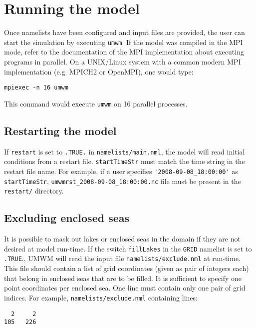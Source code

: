 \documentclass[letterpaper]{article}
\numberwithin{equation}{section}
\begin{document}
\newpage
\section{Running the model}

Once namelists have been configured and input files are provided,
the user can start the simulation by executing \verb+umwm+.
If the model was compiled in the MPI mode, refer to the documentation
of the MPI implementation about executing programs in parallel.
On a UNIX/Linux system with a common modern MPI implementation (e.g. MPICH2 or OpenMPI),
one would type:

\begin{verbatim}
mpiexec -n 16 umwm
\end{verbatim}

This command would execute \verb+umwm+ on 16 parallel processes.

\subsection{Restarting the model}
\label{sec:restart}

If \verb+restart+ is set to \verb+.TRUE.+ in \verb+namelists/main.nml+,
the model will read initial conditions from a restart file.
\verb+startTimeStr+ must match the time string in the restart file name.
For example, if a user specifies \verb+'2008-09-08_18:00:00'+ as \verb+startTimeStr+,
\verb+umwmrst_2008-09-08_18:00:00.nc+ file must be present in the \verb+restart/+ directory.

\subsection{Excluding enclosed seas}
\label{sec:lakefill}

It is possible to mask out lakes or enclosed seas in the domain 
if they are not desired at model run-time. 
If the switch \verb+fillLakes+ in the \verb+GRID+ namelist is set to \verb+.TRUE+.,
UMWM will read the input file \verb+namelists/exclude.nml+ at run-time.
This file should contain a list of grid coordinates (given as pair of integers each)
that belong in enclosed seas that are to be filled.
It is sufficient to specify one point coordinates per enclosed sea.
One line must contain only one pair of grid indices.
For example, \verb+namelists/exclude.nml+ containing lines:

\begin{verbatim}
  2     2
105   226 
\end{verbatim}
\end{document}
